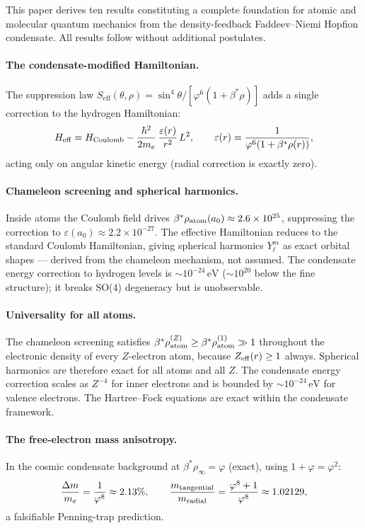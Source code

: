 \documentclass[11pt,a4paper]{article}
\theoremstyle{definition}
\theoremstyle{remark}
\newcommand{\vp}{\varphi}
\newcommand{\bst}{\beta^{*}}
\newcommand{\eps}{\varepsilon}
\newcommand{\Heff}{H_{\mathrm{eff}}}
\newcommand{\rhoinf}{\rho_{\infty}}
\newcommand{\Seff}{S_{\mathrm{eff}}}
\newcommand{\epsr}{\varepsilon(r)}
\begin{document}
This paper derives ten results constituting a complete foundation for
atomic and molecular quantum mechanics from the density-feedback
Faddeev--Niemi Hopfion condensate.
All results follow without additional postulates.

\paragraph{The condensate-modified Hamiltonian.}
The suppression law $\Seff(\theta,\rho)=\sin^4\!\theta/[\vp^6(1+\bst\rho)]$
adds a single correction to the hydrogen Hamiltonian:
\begin{equation*}
  \Heff
  = H_{\rm Coulomb}
  - \frac{\hbar^2}{2m_e}\,\frac{\epsr}{r^2}\,L^2,
  \qquad
  \epsr = \frac{1}{\vp^6(1+\bst\rho(r))},
\end{equation*}
acting only on angular kinetic energy (radial correction is exactly zero).

\paragraph{Chameleon screening and spherical harmonics.}
Inside atoms the Coulomb field drives
$\bst\rho_{\rm atom}(a_0)\approx2.6\times10^{25}$,
suppressing the correction to $\eps(a_0)\approx2.2\times10^{-27}$.
The effective Hamiltonian reduces to the standard Coulomb Hamiltonian,
giving spherical harmonics $Y_\ell^m$ as exact orbital shapes ---
derived from the chameleon mechanism, not assumed.
The condensate energy correction to hydrogen levels is $\sim10^{-24}\,\mathrm{eV}$
($\sim10^{20}$ below the fine structure); it breaks SO(4) degeneracy but is unobservable.

\paragraph{Universality for all atoms.}
The chameleon screening satisfies $\bst\rho_{\rm atom}^{(Z)}\ge\bst\rho_{\rm atom}^{(1)}\gg1$
throughout the electronic density of every $Z$-electron atom, because
$Z_{\rm eff}(r)\ge1$ always.
Spherical harmonics are therefore exact for all atoms and all $Z$.
The condensate energy correction scales as $Z^{-4}$ for inner electrons
and is bounded by $\sim10^{-24}\,\mathrm{eV}$ for valence electrons.
The Hartree--Fock equations are exact within the condensate framework.

\paragraph{The free-electron mass anisotropy.}
In the cosmic condensate background at $\bst\rhoinf=\vp$ (exact),
using $1+\vp=\vp^2$:
\[
  \frac{\Delta m}{m_e} = \frac{1}{\vp^8} \approx 2.13\%,
  \qquad
  \frac{m_{\rm tangential}}{m_{\rm radial}}
  = \frac{\vp^8+1}{\vp^8} \approx 1.02129,
\]
a falsifiable Penning-trap prediction.
\end{document}
